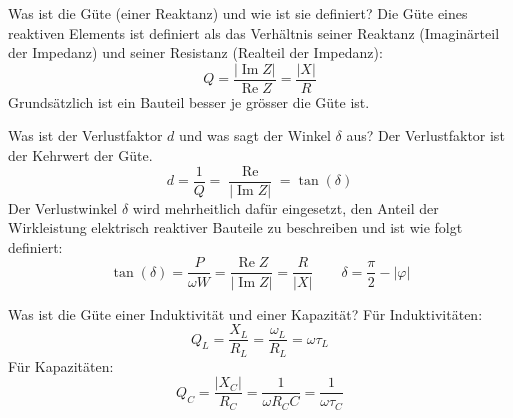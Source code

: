 
\begin{karte}{Was ist die Güte (einer Reaktanz) und wie ist sie definiert?}
	Die Güte eines reaktiven Elements ist definiert als das Verhältnis seiner Reaktanz (Imaginärteil der Impedanz) und seiner Resistanz (Realteil der Impedanz):\\
	\begin{equation*}
		Q=\frac{|\operatorname{Im} Z|}{\operatorname{Re} Z}=\frac{|X|}{R}
	\end{equation*}
	Grundsätzlich ist ein Bauteil besser je grösser die Güte ist.
\end{karte}

\begin{karte}{Was ist der Verlustfaktor $d$ und was sagt der Winkel $\delta$ aus?}
	Der Verlustfaktor ist der Kehrwert der Güte.
	\begin{equation*}
	d = \frac{1}{Q} = \frac{\operatorname{Re}}{|\operatorname{Im} Z|} = \tan (\delta)
	\end{equation*}
	Der Verlustwinkel $\delta$ wird mehrheitlich dafür eingesetzt, den Anteil der Wirkleistung elektrisch reaktiver Bauteile zu beschreiben und ist wie folgt definiert:
	\begin{equation*}
	\tan(\delta)=\frac{P}{\omega W}=\frac{\operatorname{Re} Z}{|\operatorname{Im} Z|}=\frac{R}{|X|}
	\qquad \delta = \frac{\pi}{2} - |\varphi|
	\end{equation*}
\end{karte}

\begin{karte}{Was ist die Güte einer Induktivität und einer Kapazität?}
	Für Induktivitäten:
	\begin{equation*}
		Q_L = \frac{X_L}{R_L} = \frac{\omega_L}{R_L} = \omega \tau_L
	\end{equation*}
	Für Kapazitäten:
	\begin{equation*}
		Q_C = \frac{|X_C|}{R_C} = \frac{1}{\omega R_C C} = \frac{1}{\omega \tau_C}
	\end{equation*}
\end{karte}